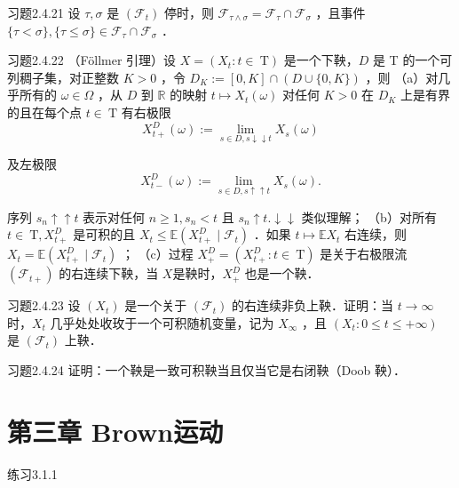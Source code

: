 \begin{namedthm}{习题2.4.21}
    设 $\tau, \sigma$ 是 $\left(\mathscr{F}_{t}\right)$ 停时，则 $\mathscr{F}_{\tau \wedge \sigma}=\mathscr{F}_{\tau} \cap \mathscr{F}_{\sigma}$ ，且事件 $\{\tau<\sigma\},\{\tau \leq \sigma\} \in \mathscr{F}_{\tau} \cap \mathscr{F}_{\sigma}$ ．
\end{namedthm}

\begin{namedthm}{习题2.4.22}
    （Föllmer 引理）设 $X=\left(X_{t}: t \in \mathrm{~T}\right)$ 是一个下鞅，$D$ 是 T 的一个可列稠子集，对正整数 $K>0$ ，令 $D_{K}:=[0, K] \cap(D \cup\{0, K\})$ ，则
（a）对几乎所有的 $\omega \in \Omega$ ，从 $D$ 到 $\mathbb{R}$ 的映射 $t \mapsto X_{t}(\omega)$ 对任何 $K>0$ 在 $D_{K}$ 上是有界的且在每个点 $t \in \mathrm{~T}$ 有右极限
$$
X_{t+}^{D}(\omega):=\lim _{s \in D, s \downarrow \downarrow t} X_{s}(\omega)
$$

及左极限
$$
X_{t-}^{D}(\omega):=\lim _{s \in D, s \uparrow \uparrow t} X_{s}(\omega) .
$$

序列 $s_{n} \uparrow \uparrow t$ 表示对任何 $n \geq 1, s_{n}<t$ 且 $s_{n} \uparrow t . \downarrow \downarrow$ 类似理解；
（b）对所有 $t \in \mathrm{~T}, X_{t+}^{D}$ 是可积的且 $X_{t} \leq \mathbb{E}\left(X_{t+}^{D} \mid \mathscr{F}_{t}\right)$ ．如果 $t \mapsto \mathbb{E} X_{t}$ 右连续，则 $X_{t}=\mathbb{E}\left(X_{t+}^{D} \mid \mathscr{F}_{t}\right)$ ；
（c）过程 $X_{+}^{D}=\left(X_{t+}^{D}: t \in \mathrm{~T}\right)$ 是关于右极限流 $\left(\mathscr{F}_{t+}\right)$ 的右连续下鞅，当 $X$是鞅时，$X_{+}^{D}$ 也是一个鞅．
\end{namedthm}

\begin{namedthm}{习题2.4.23}
    设 $\left(X_{t}\right)$ 是一个关于 $\left(\mathscr{F}_{t}\right)$ 的右连续非负上鞅．证明：当 $t \rightarrow \infty$ 时，$X_{t}$ 几乎处处收玫于一个可积随机变量，记为 $X_{\infty}$ ，且 $\left(X_{t}: 0 \leq t \leq+\infty\right)$ 是 $\left(\mathscr{F}_{t}\right)$ 上鞅．
\end{namedthm}

\begin{namedthm}{习题2.4.24}
    证明：一个鞅是一致可积鞅当且仅当它是右闭鞅（Doob 鞅）．

\end{namedthm}

\section{第三章 \quad Brown运动}
\begin{namedthm}{练习3.1.1}
    
\end{namedthm}

